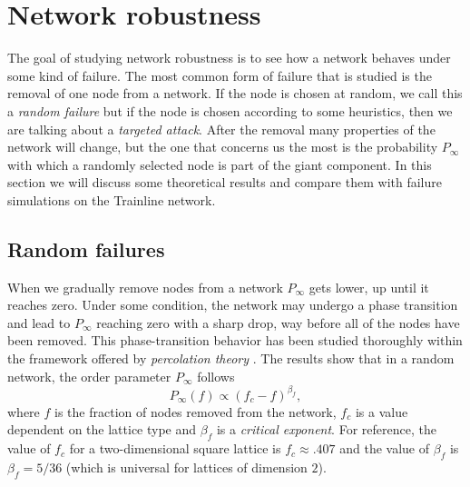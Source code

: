 \section{Network robustness}
The goal of studying network robustness is to see how a network behaves under some kind of failure. The most common form of failure that is studied is the removal of one node from a network. If the node is chosen at random, we call this a \emph{random failure} but if the node is chosen according to some heuristics, then we are talking about a \emph{targeted attack}. After the removal many properties of the network will change, but the one that concerns us the most is the probability $P_\infty$ with which a randomly selected node is part of the giant component.
In this section we will discuss some theoretical results and compare them with failure simulations on the Trainline network.

\subsection{Random failures}
When we gradually remove nodes from a network $P_\infty$ gets lower, up until it reaches zero. Under some condition, the network may undergo a phase transition and lead to $P_\infty$ reaching zero with a sharp drop, way before all of the nodes have been removed. This phase-transition behavior has been studied thoroughly within the framework offered by \emph{percolation theory} \cite{disorderedSystems}.
The results show that in a random network, the order parameter $P_\infty$ follows
\begin{equation*}
    P_\infty(f) \propto (f_c-f)^{\beta_f},
    \label{eq:percolation}
\end{equation*}
where $f$ is the fraction of nodes removed from the network, $f_c$ is a value dependent on the lattice type and $\beta_f$ is a \emph{critical exponent}. For reference, the value of $f_c$ for a two-dimensional square lattice is $f_c \approx .407$ and the value of $\beta_f$ is $\beta_f = 5/36$ (which is universal for lattices of dimension $2$).

